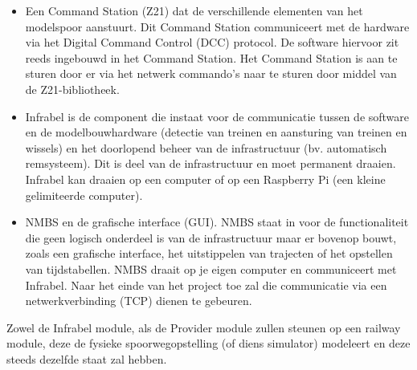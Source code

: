 \documentclass[a4paper, 11pt]{article}
\newcommand{\<}{\scriptsize\textless\normalsize}
\renewcommand{\>}{\scriptsize\textgreater\normalsize}
\begin{document}
\begin{itemize}
	\item Een Command Station (Z21) dat de verschillende elementen van het modelspoor aanstuurt. Dit Command Station communiceert met de hardware via het Digital Command Control (DCC) protocol. De software hiervoor zit reeds ingebouwd in het Command Station. Het Command Station is aan te sturen door er via het netwerk commando’s naar te sturen door middel van de Z21-bibliotheek.
	\item Infrabel is de component die instaat voor de communicatie tussen de software en de
	modelbouwhardware (detectie van treinen en aansturing van treinen en wissels) en het
	doorlopend beheer van de infrastructuur (bv. automatisch remsysteem). Dit is deel van de infrastructuur en moet permanent draaien. Infrabel kan draaien op een computer of op een Raspberry Pi (een kleine gelimiteerde computer).
	\item NMBS en de grafische interface (GUI). NMBS staat in voor de functionaliteit die geen
	logisch onderdeel is van de infrastructuur maar er bovenop bouwt, zoals een grafische
	interface, het uitstippelen van trajecten of het opstellen van tijdstabellen. NMBS draait
	op je eigen computer en communiceert met Infrabel. Naar het einde van het project toe
	zal die communicatie via een netwerkverbinding (TCP) dienen te gebeuren.
\end{itemize}
Zowel de Infrabel module, als de Provider module zullen steunen op een railway module, deze de fysieke spoorwegopstelling (of diens simulator) modeleert en deze steeds dezelfde staat zal hebben.\\\\


\newpage
\end{document}
